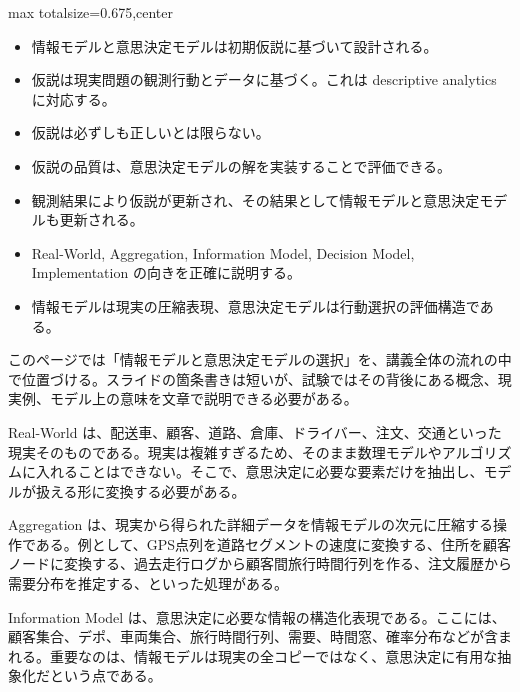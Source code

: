 \clearpage
{}
\begin{adjustbox}{max totalsize={\textwidth}{0.675\textheight},center}
\begin{minipage}{\textwidth}\scriptsize
\begin{minipage}[t]{0.485\textwidth}
\begin{itemize}
\item 情報モデルと意思決定モデルは初期仮説に基づいて設計される。
\item 仮説は現実問題の観測行動とデータに基づく。これは descriptive analytics に対応する。
\item 仮説は必ずしも正しいとは限らない。
\item 仮説の品質は、意思決定モデルの解を実装することで評価できる。
\item 観測結果により仮説が更新され、その結果として情報モデルと意思決定モデルも更新される。
\end{itemize}
\begin{itemize}
\item Real-World, Aggregation, Information Model, Decision Model, Implementation の向きを正確に説明する。
\item 情報モデルは現実の圧縮表現、意思決定モデルは行動選択の評価構造である。
\end{itemize}
\end{minipage}\hfill
\begin{minipage}[t]{0.485\textwidth}
このページでは「情報モデルと意思決定モデルの選択」を、講義全体の流れの中で位置づける。スライドの箇条書きは短いが、試験ではその背後にある概念、現実例、モデル上の意味を文章で説明できる必要がある。\par
Real-World は、配送車、顧客、道路、倉庫、ドライバー、注文、交通といった現実そのものである。現実は複雑すぎるため、そのまま数理モデルやアルゴリズムに入れることはできない。そこで、意思決定に必要な要素だけを抽出し、モデルが扱える形に変換する必要がある。\par
Aggregation は、現実から得られた詳細データを情報モデルの次元に圧縮する操作である。例として、GPS点列を道路セグメントの速度に変換する、住所を顧客ノードに変換する、過去走行ログから顧客間旅行時間行列を作る、注文履歴から需要分布を推定する、といった処理がある。\par
Information Model は、意思決定に必要な情報の構造化表現である。ここには、顧客集合、デポ、車両集合、旅行時間行列、需要、時間窓、確率分布などが含まれる。重要なのは、情報モデルは現実の全コピーではなく、意思決定に有用な抽象化だという点である。\par

\end{minipage}
\end{minipage}
\end{adjustbox}
